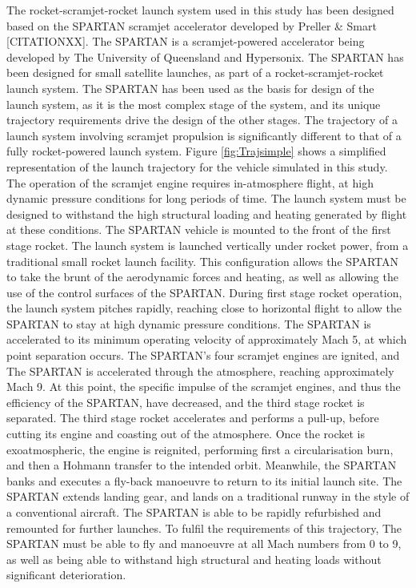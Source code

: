  The rocket-scramjet-rocket launch system used in this study has been designed based on the SPARTAN scramjet accelerator developed by Preller \& Smart [CITATIONXX]. The SPARTAN is a scramjet-powered accelerator being developed by The University of Queensland and Hypersonix. The SPARTAN has been designed for small satellite launches, as part of a rocket-scramjet-rocket launch system.
 The SPARTAN has been used as the basis for design of the launch system, as it is the most complex stage of the system, and its unique trajectory requirements drive the design of the other stages.
 The trajectory of a launch system involving scramjet propulsion is significantly different to that of a fully rocket-powered launch system. Figure \ref{fig:Trajsimple} shows a simplified representation of the launch trajectory for the vehicle simulated in this study. The operation of the scramjet engine requires in-atmosphere flight, at high dynamic pressure conditions for long periods of time. The launch system must be designed to withstand the high structural loading and heating generated by flight at these conditions. 
 The SPARTAN vehicle is mounted to the front of the first stage rocket. The launch system is launched vertically under rocket power, from a traditional small rocket launch facility. 
 This configuration allows the SPARTAN to take the brunt of the aerodynamic forces and heating, as well as allowing the use of the control surfaces of the SPARTAN. During first stage rocket operation, the launch system pitches rapidly, reaching close to horizontal flight to allow the SPARTAN to stay at high dynamic pressure conditions. The SPARTAN is accelerated to its minimum operating velocity of approximately Mach 5, at which point separation occurs. The SPARTAN's four scramjet engines are ignited, and The SPARTAN is accelerated through the atmosphere, reaching approximately Mach 9. At this point, the specific impulse of the scramjet engines, and thus the efficiency of the SPARTAN, have decreased, and the third stage rocket is separated. The third stage rocket accelerates and performs a pull-up, before cutting its engine and coasting out of the atmosphere. Once the rocket is exoatmospheric, the engine is reignited, performing first a circularisation burn, and then a Hohmann transfer to the intended orbit. Meanwhile, the SPARTAN banks and executes a fly-back manoeuvre to return to its initial launch site. The SPARTAN extends landing gear, and lands on a traditional runway in the style of a conventional aircraft. The SPARTAN is able to be rapidly refurbished and remounted for further launches. To fulfil the requirements of this trajectory, The SPARTAN must be able to fly and manoeuvre at all Mach numbers from 0 to 9, as well as being able to withstand high structural and heating loads without significant deterioration.
 
